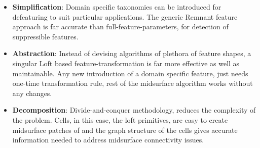 \begin{itemize}[noitemsep,topsep=2pt,parsep=2pt,partopsep=2pt]
\item \textbf{Simplification}: Domain specific taxonomies can be introduced for defeaturing to suit particular applications. The generic Remnant feature approach is far accurate than full-feature-parameters, for detection of suppressible features.
\item \textbf{Abstraction}: Instead of devising algorithms of plethora of feature shapes, a singular Loft based feature-transformation is far more effective as well as maintainable. Any new introduction of a domain specific feature, just needs one-time transformation rule, rest of the midsurface algorithm works without any changes.
\item \textbf{Decomposition}: Divide-and-conquer methodology, reduces the complexity of the problem. Cells, in this case, the loft primitives, are easy to create midsurface patches of and the graph structure of the cells gives accurate information needed to address midsurface connectivity issues.
\end{itemize}



